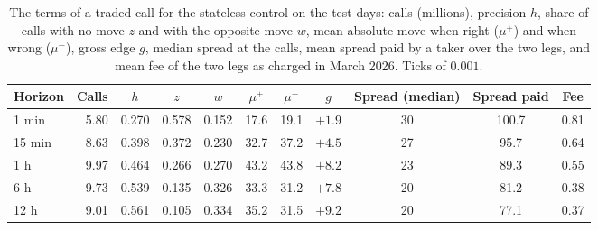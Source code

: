 \begin{table}[t]
\centering
\caption{The terms of a traded call for the stateless control on the test days: calls
(millions), precision $h$, share of calls with no move $z$ and with the opposite move $w$,
mean absolute move when right ($\mu^{+}$) and when wrong ($\mu^{-}$), gross edge $g$, median
spread at the calls, mean spread paid by a taker over the two legs, and mean fee of the two
legs as charged in March 2026.  Ticks of $0.001$.}
\label{tab:econ:terms}
\small
\begin{fittable}\begin{tabular}{lrccccccccc}
\toprule
Horizon & Calls & $h$ & $z$ & $w$ & $\mu^{+}$ & $\mu^{-}$ & $g$ & Spread (median) & Spread paid & Fee \\
\midrule
1 min & 5.80 & 0.270 & 0.578 & 0.152 & 17.6 & 19.1 & $+1.9$ & 30 & 100.7 & 0.81 \\
15 min & 8.63 & 0.398 & 0.372 & 0.230 & 32.7 & 37.2 & $+4.5$ & 27 & 95.7 & 0.64 \\
1 h & 9.97 & 0.464 & 0.266 & 0.270 & 43.2 & 43.8 & $+8.2$ & 23 & 89.3 & 0.55 \\
6 h & 9.73 & 0.539 & 0.135 & 0.326 & 33.3 & 31.2 & $+7.8$ & 20 & 81.2 & 0.38 \\
12 h & 9.01 & 0.561 & 0.105 & 0.334 & 35.2 & 31.5 & $+9.2$ & 20 & 77.1 & 0.37 \\
\bottomrule
\end{tabular}\end{fittable}
\end{table}

